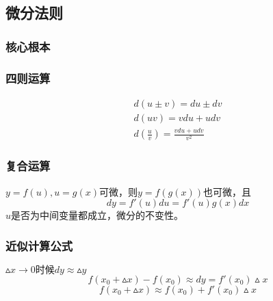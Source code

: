 \subsection{微分法则}
\subsubsection{核心根本}
\begin{figure}[htp]
    \centering
\end{figure}
\subsubsection{四则运算}
\begin{align}
    d\left(u\pm v\right)=du\pm dv\\
    d(uv)=vdu+udv\\
    d\left(\frac{u}{v}\right)=\frac{vdu+udv}{v^2}
\end{align}
\subsubsection{复合运算}
\begin{center}
    $y=f(u),u=g(x)$可微，则$y=f(g(x))$也可微，且
    $$dy=f'(u)du=f'(u)g(x)dx$$
    $u$是否为中间变量都成立，微分的不变性。
\end{center}
\subsubsection{近似计算公式}
$\vartriangle x\rightarrow 0\mbox{时候}dy\approx \vartriangle y$
$$f(x_0+\vartriangle x)-f(x_0)\approx dy=f'(x_0)\vartriangle x$$
$$f(x_0+\vartriangle x)\approx f(x_0)+f'(x_0)\vartriangle x$$